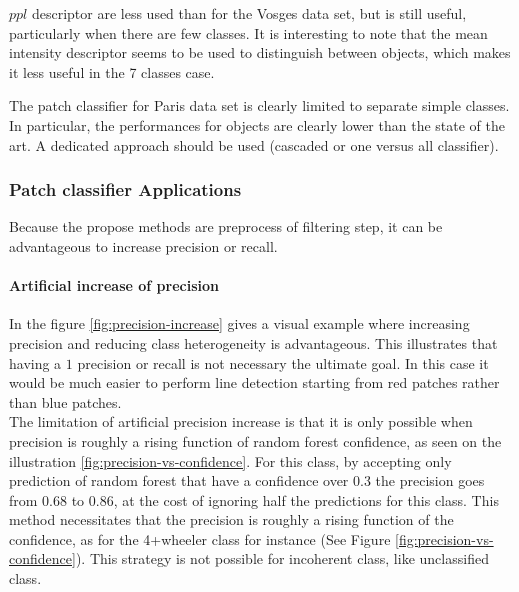 				 $ppl$ descriptor are less used than for the Vosges data set, but is still useful, particularly when there are few classes.
				 It is interesting to note that the mean intensity descriptor seems to be used to distinguish between objects, which makes it less useful in the 7 classes case.
				 
				 The patch classifier for Paris data set is clearly limited to separate simple classes. In particular, the performances for objects are clearly lower than the state of the art. A dedicated approach should be used (cascaded or one versus all classifier). 
				 
		 \subsubsection{Patch classifier Applications}
			 Because the propose methods are preprocess of filtering step, it can be advantageous to increase precision or recall.
			 \paragraph{Artificial increase of precision}
				 In the figure \ref{fig:precision-increase} gives a visual example where increasing precision and reducing class heterogeneity is advantageous. This illustrates that having a $1$ precision or recall is not necessary the ultimate goal.
				 In this case it would be much easier to perform line detection starting from red patches rather than blue patches.
				 \\
				 The limitation of artificial precision increase is 
				 that it is only possible when precision is roughly a rising function of random forest confidence, as seen on the illustration \ref{fig:precision-vs-confidence}.
				 For this class, by accepting only prediction of random forest that have a confidence over $0.3$ the precision goes from $0.68$ to $0.86$, at the cost of ignoring half the predictions for this class.
			 	This method necessitates that the precision is roughly a rising function of the confidence, as for the 4+wheeler class for instance (See Figure \ref{fig:precision-vs-confidence}).  
				 This strategy is not possible for incoherent class, like unclassified class.
				 
				 
